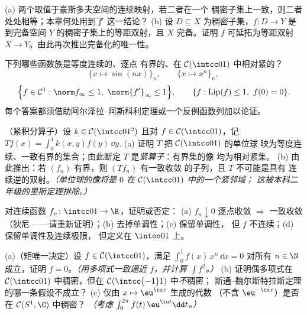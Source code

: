 \begin{exercise}[$\star\star$]\label{exo:b3:complete:5}
(a) 两个取值于豪斯多夫空间的连续映射，若二者在一个
稠密子集上一致，则二者处处相等；本章何处用到了
这一结论？
(b) 设 $D \subseteq X$ 为稠密子集，$f \colon D \to Y$ 是
到完备空间 $Y$ 的稠密子集上的等距双射，且
$X$ 完备。证明 $f$ 可延拓为等距双射
$X \to Y$。由此再次推出完备化的唯一性。
\end{exercise}

\begin{exercise}[$\star\star$]\label{exo:b3:complete:6}
下列哪些函数族是等度连续的、逐点
有界的、在 $\mathcal C(\intcc01)$ 中相对紧的？
\[
\{x \mapsto \sin(nx)\}_{n},\qquad
\{x \mapsto x^n\}_n,
\]
\[
\Bigl\{f \in \mathcal C^1 : \norm f_\infty \leq 1,\
\norm{f'}_\infty \leq 1\Bigr\},\qquad
\{f : \operatorname{Lip}(f)\leq 1,\ f(0) = 0\}.
\]
每个答案都须借助阿尔泽拉–阿斯科利定理或一个反例函数列加以论证。
\end{exercise}

\begin{exercise}[$\star\star\star$]\label{exo:b3:complete:7}
（紧积分算子）设 $k \in \mathcal C(\intcc01^2)$
且对 $f \in \mathcal C(\intcc01)$，记 $Tf(x) =
\int_0^1k(x,y)f(y)\,\dd y$.
(a) 证明 $T$ 把 $\mathcal C(\intcc01)$ 的单位球
映为等度连续、一致有界的集合；由此断定 $T$
是\emph{紧算子}：有界集的像
均为相对紧集。
(b) 由此推出：若 $(f_n)$ 有界，则 $(Tf_n)$ 有一致收敛
的子列，且 $T$ 不可能是具有
连续逆的双射。\emph{（单位球的像将是
$0$ 在 $\mathcal C(\intcc01)$ 中的一个紧邻域；
这被本科二年级的里斯定理排除。）}
\end{exercise}

\begin{exercise}[$\star\star$]\label{exo:b3:complete:8}
对连续函数 $f_n \colon \intcc01 \to \R$，证明或否定：
(a) $f_n \downarrow 0$ 逐点收敛 $\Rightarrow$ 一致收敛（狄尼
——请重新证明）；(b) 去掉单调性；(c) 保留单调性，
但 $f$ 不连续；(d) 保留单调性及连续极限，
但定义在 $\intoo01$ 上。
\end{exercise}

\begin{exercise}[$\star\star$]\label{exo:b3:complete:9}
(a)（矩唯一决定）设 $f \in \mathcal C(\intcc01)$，满足
$\int_0^1 f(x)\,x^n\,\dd x = 0$ 对所有 $n \in \N$ 成立，证明 $f =
0$。\emph{（用多项式一致逼近 $f$，并计算
$\int f^2$。）}
(b) 证明偶多项式在 $\mathcal
C(\intcc01)$ 中稠密，但在 $\mathcal C(\intcc{-1}1)$ 中\emph{不}稠密；
斯通–魏尔斯特拉斯定理的哪一条假设不成立？
(c) 仅由 $x \mapsto \eu^{\iu x}$ 生成的代数
（不含 $\eu^{-\iu x}$）是否在 $\mathcal C(S^1, \C)$ 中稠密？
\emph{（考虑 $\int_0^{2\pi}f(t)\,\eu^{\iu t}\dd t$。）}
\end{exercise}

